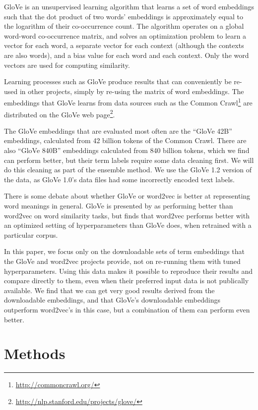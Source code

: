 \documentclass[11pt,letterpaper]{article}
\begin{document}
GloVe \cite{pennington2014glove} is an unsupervised learning algorithm that
learns a set of word embeddings such that the dot product of two words'
embeddings is approximately equal to the logarithm of their co-occurrence count.
The algorithm operates on a global word-word co-occurrence matrix, and
solves an optimization problem to learn a vector for each word, a separate
vector for each context (although the contexts are also words), and a bias
value for each word and each context. Only the word vectors are used for
computing similarity.

Learning processes such as GloVe produce results that can conveniently be
re-used in other projects, simply by re-using the matrix of word embeddings.
The embeddings that GloVe learns from data sources such as the Common
Crawl\footnote{\url{http://commoncrawl.org/}} are
distributed on the GloVe web
page\footnote{\url{http://nlp.stanford.edu/projects/glove/}}.

The GloVe embeddings that are evaluated most often are the ``GloVe 42B''
embeddings, calculated from 42 billion tokens of the Common Crawl. There are
also ``GloVe 840B'' embeddings calculated from 840 billion tokens, which we
find can perform better, but their term labels require some data cleaning
first.  We will do this cleaning as part of the ensemble method. We use the
GloVe 1.2 version of the data, as GloVe 1.0's data files had some incorrectly
encoded text labels.

There is some debate about whether GloVe or word2vec is better at representing
word meanings in general. GloVe is presented by 
as performing better than word2vec on word similarity tasks, but
 finds that word2vec performs better with an
optimized setting of hyperparameters than GloVe does, when retrained with a
particular corpus.

In this paper, we focus only on the downloadable sets of term embeddings that
the GloVe and word2vec projects provide, not on re-running them with tuned
hyperparameters. Using this data makes it possible to reproduce their results
and compare directly to them, even when their preferred input data is not
publically available. We find that we can get very good results derived from
the downloadable embeddings, and that GloVe's downloadable embeddings outperform
word2vec's in this case, but a combination of them can perform even better.

\section{Methods}
\end{document}
